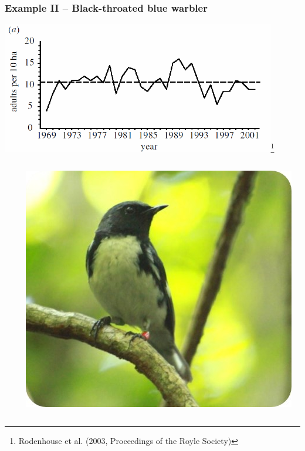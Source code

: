 \documentclass[color=usenames,dvipsnames]{beamer}
\begin{document}
\begin{frame}[fragile]
  \frametitle{Example II -- Black-throated blue warbler}
  {\centering
    \includegraphics[width=0.9\textwidth]{figs/btbw}\let\thefootnote\relax\footnote{\tiny Rodenhouse et
      al. (2003, Proceedings of the Royle Society)} \\
  }
  \begin{columns}
    \begin{column}{0.8\textwidth}
    \end{column}
    \hfill
    \begin{column}{0.19\textwidth}
    \includegraphics[width=\textwidth]{figs/btbw1}
  \end{column}
\end{columns}
\end{frame}
\end{document}
